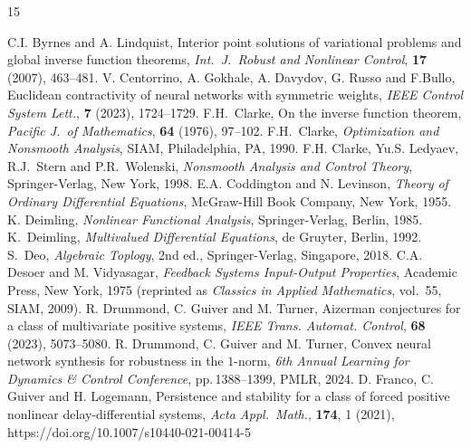 \documentclass[a4paper,11pt]{article}
\numberwithin{equation}{section}
\numberwithin{figure}{section}
\numberwithin{table}{section}
\begin{document}
\begin{thebibliography}{15}
\begin{small}
%
\vspace{-2mm}
C.I. Byrnes and A. Lindquist, Interior point solutions of variational problems and global
inverse function theorems,  {\it Int.\ J.\ Robust and Nonlinear
    Control}, {\bf 17} (2007), 463--481.
%
\vspace{-2mm}
V. Centorrino, A. Gokhale, A. Davydov, G. Russo and F.Bullo, Euclidean
  contractivity of neural networks with symmetric weights, {\it IEEE Control
  System Lett.}, {\bfseries 7} (2023), 1724--1729.
%
\vspace{-2mm}
 F.H.\ Clarke, On the inverse function theorem, {\it Pacific J.\ of Mathematics},
{\bfseries 64} (1976), 97--102.
%
\vspace{-2mm}
 F.H.\ Clarke, {\it Optimization and Nonsmooth Analysis}, SIAM, Philadelphia, PA, 1990.
%
\vspace{-2mm}
 F.H. Clarke, Yu.S. Ledyaev, R.J.\ Stern and P.R.\ Wolenski, {\it Nonsmooth Analysis and Control Theory}, Springer-Verlag, New York, 1998.
%
\vspace{-2mm}
 E.A. Coddington and N. Levinson, {\it Theory of Ordinary Differential Equations}, McGraw-Hill Book Company, New York, 1955.
%
\vspace{-2mm}
 K. Deimling, {\it Nonlinear Functional Analysis}, Springer-Verlag, Berlin, 1985.
%
\vspace{-2mm}
K.\ Deimling, {\it Multivalued Differential Equations}, de Gruyter, Berlin, 1992.
%
\vspace{-2mm}
 S.\ Deo, {\it Algebraic Toplogy}, 2nd ed., Springer-Verlag, Singapore, 2018.
%
\vspace{-2mm}
 C.A. Desoer and  M. Vidyasagar, {\it Feedback Systems
Input-Output Properties}, Academic Press, New York, 1975 (reprinted as {\it Classics in Applied Mathematics}, vol.\ 55, SIAM, 2009).
%
\vspace{-2mm}
R. Drummond, C. Guiver and M. Turner, Aizerman conjectures for a class of multivariate positive systems, {\it IEEE Trans. Automat. Control}, {\bf 68} (2023), 5073--5080.
%
\vspace{-2mm}
R. Drummond, C. Guiver and M. Turner, Convex neural network synthesis for
  robustness in the $1$-norm, {\it 6th Annual Learning for Dynamics \&
  Control Conference}, pp.\,1388--1399, PMLR, 2024.
%
\vspace{-2mm}
D. Franco, C. Guiver and H. Logemann, Persistence and stability for a class of forced positive nonlinear delay-differential systems, {\it Acta Appl.\ Math.}, {\bf 174}, 1 (2021), https://doi.org/10.1007/s10440-021-00414-5

\end{small}
\end{thebibliography}
\end{document}
